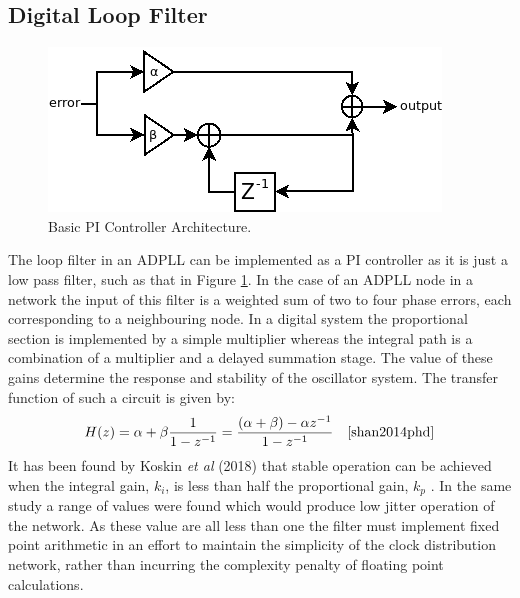 \documentclass[11pt,english,british]{report}
\begin{document}
\subsection{Digital Loop Filter}
\begin{figure}[h]
	\centering
	\includegraphics[scale=0.45]{../pi_simple} %
	\caption{Basic PI Controller Architecture.}
	\label{fig:my_simple_pi}
\end{figure}
The loop filter in an ADPLL can be implemented as a PI controller as it is just a low pass filter, such as that in Figure \ref{fig:my_simple_pi}. In the case of an ADPLL node in a network the input of this filter is a weighted sum of two to four phase errors, each corresponding to a neighbouring node. In a digital system the proportional section is implemented by a simple multiplier whereas the integral path is a combination of a multiplier and a delayed summation stage. The value of these gains determine the response and stability of the oscillator system. The transfer function of such a circuit is given by:
\begin{equation*}
	H(z) = \alpha + \beta\frac{1}{1-z^{-1}} = \frac{(\alpha + \beta) - \alpha z^{-1}}{1-z^{-1}}~~~\cite{shan2014phd}
\end{equation*}
It has been found by Koskin \textit{et al} (2018) that stable operation can be achieved when the integral gain, $k_i$, is less than half the proportional gain, $k_p$ \cite{koskin2018generation}. In the same study a range of values were found which would produce low jitter operation of the network. As these value are all less than one the filter must implement fixed point arithmetic in an effort to maintain the simplicity of the clock distribution network, rather than incurring the complexity penalty of floating point calculations.
\end{document}
